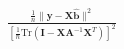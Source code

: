\documentclass[10pt]{article}
\begin{document}
\begin{align*}\frac{\frac{1}{n}\lVert \boldsymbol y - \boldsymbol X \boldsymbol{\hat{b}} \rVert^2}
{\left[\frac{1}{n}\mathrm{Tr} \left( \boldsymbol I - \boldsymbol X \boldsymbol A^{-1} \boldsymbol X^T \right)
\right]^2}\end{align*}
\end{document}
